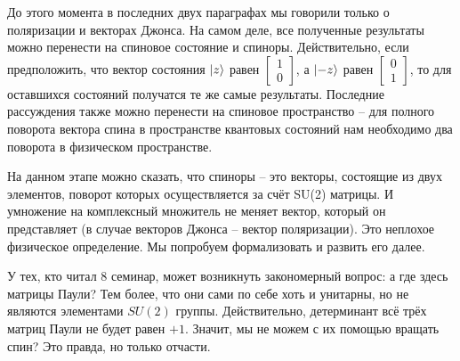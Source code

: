 До этого момента в последних двух параграфах мы говорили только о поляризации и векторах Джонса. На самом деле, все полученные результаты можно перенести на спиновое состояние и спиноры. Действительно, если предположить, что вектор состояния $\ket{z}$ равен $\begin{bmatrix} 1 \\ 0 \end{bmatrix}$, а $\ket{-z}$ равен $\begin{bmatrix} 0 \\ 1 \end{bmatrix}$, то для оставшихся состояний получатся те же самые результаты. Последние рассуждения также можно перенести на спиновое пространство -- для полного поворота вектора спина в пространстве квантовых состояний нам необходимо два поворота в физическом пространстве.

На данном этапе можно сказать, что спиноры -- это векторы, состоящие из двух элементов, поворот которых осуществляется за счёт SU(2) матрицы. И умножение на комплексный множитель не меняет вектор, который он представляет (в случае векторов Джонса -- вектор поляризации). Это неплохое физическое определение. Мы попробуем формализовать и развить его далее.

У тех, кто читал 8 семинар, может возникнуть закономерный вопрос: а где здесь матрицы Паули? Тем более, что они сами по себе хоть и унитарны, но не являются элементами $SU(2)$ группы. Действительно, детерминант всё трёх матриц Паули не будет равен $+1$. Значит, мы не можем с их помощью вращать спин? Это правда, но только отчасти.
